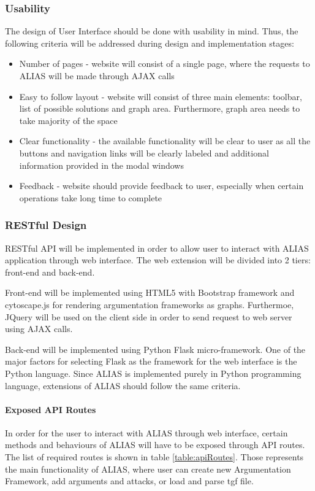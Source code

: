 \subsubsection{Usability}
The design of User Interface should be done with usability in mind. Thus, the following criteria will be addressed during design and implementation stages:
\begin{itemize}
	\item Number of pages - website will consist of a single page, where the requests to ALIAS will be made through AJAX calls
	\item Easy to follow layout - website will consist of three main elements: toolbar, list of possible solutions and graph area. Furthermore, graph area needs to take majority of the space
	\item Clear functionality - the available functionality will be clear to user as all the buttons and navigation links will be clearly labeled and additional information provided in the modal windows
	\item Feedback - website should provide feedback to user, especially when certain operations take long time to complete
\end{itemize}

\subsubsection{RESTful Design}
RESTful API will be implemented in order to allow user to interact with ALIAS application through web interface. The web extension will be divided into 2 tiers: front-end and back-end. 

Front-end will be implemented using HTML5 with Bootstrap framework and cytoscape.js \citep{cytoscapejs} for rendering argumentation frameworks as graphs. Furthermoe, JQuery will be used on the client side in order to send request to web server using AJAX calls.

Back-end will be implemented using Python Flask \citep{flaskDocs} micro-framework. One of the major factors for selecting Flask as the framework for the web interface is the Python language. Since ALIAS is implemented purely in Python programming language, extensions of ALIAS should follow the same criteria. 

\paragraph{Exposed API Routes} 
In order for the user to interact with ALIAS through web interface, certain methods and behaviours of ALIAS will have to be exposed through API routes. The list of required routes is shown in table \ref{table:apiRoutes}. Those represents the main functionality of ALIAS, where user can create new Argumentation Framework, add arguments and attacks, or load and parse tgf file.


